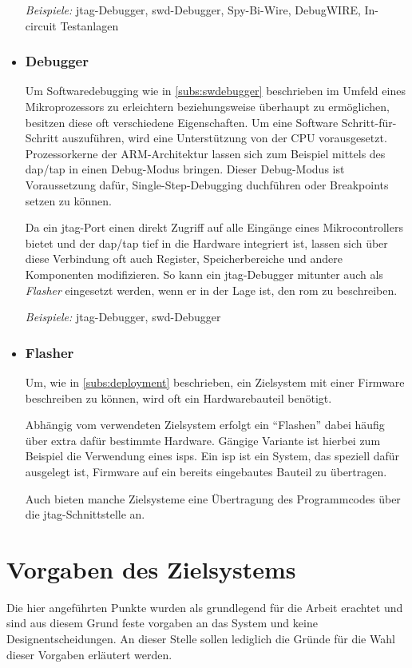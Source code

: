 \begin{itemize}
  \emph{Beispiele:} \gls{jtag}-Debugger, \gls{swd}-Debugger, Spy-Bi-Wire,
  DebugWIRE, In-circuit Testanlagen
  \item \subsubsection*{Debugger}\label{subs:hwdebugger}  Um
  Softwaredebugging wie in \autoref{subs:swdebugger} beschrieben im Umfeld eines
  Mikroprozessors zu erleichtern beziehungsweise überhaupt zu ermöglichen,
  besitzen diese oft verschiedene Eigenschaften.
  Um eine Software Schritt-für-Schritt auszuführen, wird eine Unterstützung von
  der CPU vorausgesetzt. Prozessorkerne der ARM-Architektur lassen sich zum
  Beispiel mittels des \gls{dap}/\gls{tap} in einen Debug-Modus bringen.
  Dieser Debug-Modus ist Voraussetzung dafür, Single-Step-Debugging duchführen
  oder Breakpoints setzen zu können.
  
  Da ein \gls{jtag}-Port einen direkt Zugriff auf alle Eingänge eines
  Mikrocontrollers bietet und der \gls{dap}/\gls{tap} tief in die Hardware
  integriert ist, lassen sich über diese Verbindung oft auch Register,
  Speicherbereiche und andere Komponenten modifizieren. So kann ein
  \gls{jtag}-Debugger mitunter auch als \emph{Flasher} eingesetzt werden, wenn
  er in der Lage ist, den \gls{rom} zu beschreiben.
  
  \emph{Beispiele:} \gls{jtag}-Debugger, \gls{swd}-Debugger
  \item \subsubsection*{Flasher} Um, wie in \autoref{subs:deployment}
  beschrieben, ein Zielsystem mit einer Firmware beschreiben zu können, wird
  oft ein Hardwarebauteil benötigt.
  
  Abhängig vom verwendeten Zielsystem erfolgt ein "`Flashen"' dabei häufig über
  extra dafür bestimmte Hardware. Gängige Variante ist hierbei zum Beispiel die
  Verwendung eines \glspl{isp}. Ein \gls{isp} ist ein System, das speziell
  dafür ausgelegt ist, Firmware auf ein bereits eingebautes Bauteil zu übertragen.
  
  Auch bieten manche Zielsysteme eine Übertragung des Programmcodes über die
  \gls{jtag}-Schnittstelle an.
\end{itemize}
\section{Vorgaben des Zielsystems}
Die hier angeführten Punkte wurden als grundlegend für die Arbeit erachtet und
sind aus diesem Grund feste vorgaben an das System und keine
Designentscheidungen. An dieser Stelle sollen lediglich die Gründe für
die Wahl dieser Vorgaben erläutert werden.

